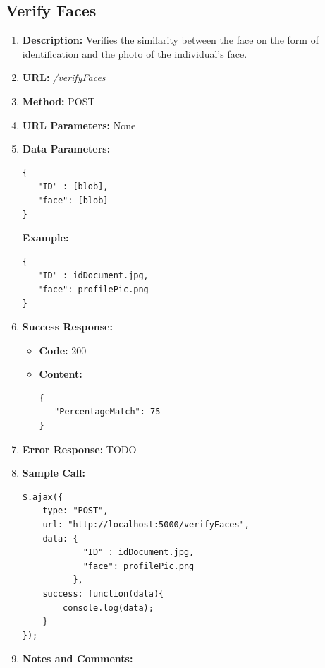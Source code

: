 \documentclass{article}
\begin{document}
\subsection{Verify Faces}
\begin{enumerate}
	\item \textbf{Description:} Verifies the similarity between the face on the form of identification and the photo of the individual's face.
	\item \textbf{URL:} \textit{/verifyFaces}
	\item \textbf{Method:} POST
	\item \textbf{URL Parameters:} None
	\item \textbf{Data Parameters:}

	\begin{lstlisting}
{
   "ID" : [blob],
   "face": [blob]
}
	\end{lstlisting}

	\textbf{Example:}

	\begin{lstlisting}
{
   "ID" : idDocument.jpg,
   "face": profilePic.png
}
	\end{lstlisting}
	
	\item \textbf{Success Response:} 
		\begin{itemize}
			\item \textbf{Code:} 200
			\item \textbf{Content:}
			\begin{lstlisting}
{
   "PercentageMatch": 75
}
			\end{lstlisting}
		\end{itemize}
		\item \textbf{Error Response:} TODO
		\item \textbf{Sample Call:}
		\begin{lstlisting}
$.ajax({
    type: "POST",
    url: "http://localhost:5000/verifyFaces",
    data: {
            "ID" : idDocument.jpg,
            "face": profilePic.png
          },
    success: function(data){
        console.log(data);
    }
});
		\end{lstlisting}
		\item \textbf{Notes and Comments:}
\end{enumerate}
\end{document}
